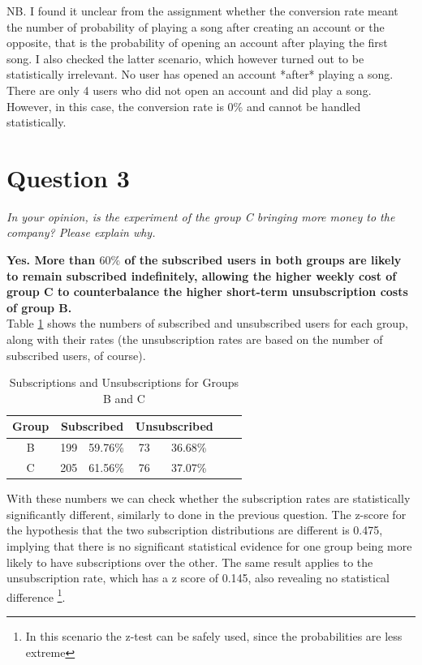 \documentclass[paper=a4, fontsize=10pt]{report}
\begin{document}
NB. I found it unclear from the assignment whether the conversion rate meant the number of probability of
playing a song after creating an account or the opposite, that is the probability of opening an account after
playing the first song. I also checked the latter scenario, which however turned out to be statistically irrelevant.
No user has opened an account *after* playing a song. There are only 4 users who did not open an account and did play a song.
However, in this case, the conversion rate is $0\%$ and cannot be handled statistically.

\section*{Question 3}

\textit{In your opinion, is the experiment of the group C bringing more money to the company? Please explain why.}

\textbf{Yes. More than $60\%$ of the subscribed users in both groups are likely to remain subscribed indefinitely, allowing
the higher weekly cost of group C to counterbalance the higher short-term unsubscription costs of group B.}\\



Table \ref{tab:sub_unsub_rates} shows the numbers of subscribed and unsubscribed users for each group, along with their rates (the unsubscription rates are based on the number of subscribed users, of course).

\begin{table}[htbp]
\normalsize

  \centering
  \caption{Subscriptions and Unsubscriptions for Groups B and C}
    \begin{tabular}{ccccccc}
    \toprule
    \textbf{Group } & \multicolumn{2}{c}{\textbf{Subscribed}} & \multicolumn{2}{c}{\textbf{Unsubscribed}} \\
    \midrule
    B & 199  & 59.76\% & 73  & 36.68\%  \\
    C & 205   & 61.56\% & 76   & 37.07\%  \\
    \bottomrule
    \end{tabular}%
  \label{tab:sub_unsub_rates}%
\end{table}%
\normalsize

With these numbers we can check whether the subscription rates are statistically significantly different, similarly
to done in the previous question. The z-score for the hypothesis that the two subscription distributions are different is 0.475, implying that there is no significant statistical evidence for one group being more likely to have
subscriptions over the other. The same result applies to the unsubscription rate, which has a z score of 0.145, also revealing no statistical difference
\footnote{In this scenario the z-test can be safely used, since the probabilities are less extreme}.
\end{document}
